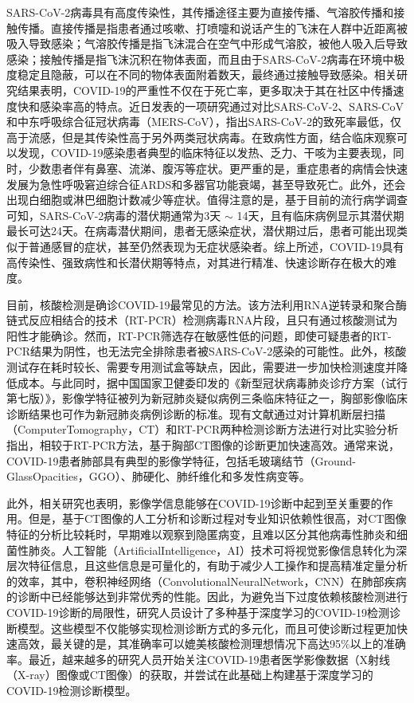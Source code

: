 \documentclass[journal,twoside,web]{ieeecolor}
\begin{document}
SARS-CoV-2病毒具有高度传染性，其传播途径主要为直接传播、气溶胶传播和接触传播。直接传播是指患者通过咳嗽、打喷嚏和说话产生的飞沫在人群中近距离被吸入导致感染；气溶胶传播是指飞沫混合在空气中形成气溶胶，被他人吸入后导致感染；接触传播是指飞沫沉积在物体表面，而且由于SARS-CoV-2病毒在环境中极度稳定且隐蔽，可以在不同的物体表面附着数天，最终通过接触导致感染。相关研究结果表明，COVID-19的严重性不仅在于死亡率，更多取决于其在社区中传播速度快和感染率高的特点。近日发表的一项研究通过对比SARS-CoV-2、SARS-CoV和中东呼吸综合征冠状病毒（MERS-CoV），指出SARS-CoV-2的致死率最低，仅高于流感，但是其传染性高于另外两类冠状病毒。在致病性方面，结合临床观察可以发现，COVID-19感染患者典型的临床特征以发热、乏力、干咳为主要表现，同时，少数患者伴有鼻塞、流涕、腹泻等症状。更严重的是，重症患者的病情会快速发展为急性呼吸窘迫综合征ARDS和多器官功能衰竭，甚至导致死亡。此外，还会出现白细胞或淋巴细胞计数减少等症状。值得注意的是，基于目前的流行病学调查可知，SARS-CoV-2病毒的潜伏期通常为3天 $ \sim $ 14天，且有临床病例显示其潜伏期最长可达24天。在病毒潜伏期间，患者无感染症状，潜伏期过后，患者可能出现类似于普通感冒的症状，甚至仍然表现为无症状感染者。综上所述，COVID-19具有高传染性、强致病性和长潜伏期等特点，对其进行精准、快速诊断存在极大的难度。


目前，核酸检测是确诊COVID-19最常见的方法。该方法利用RNA逆转录和聚合酶链式反应相结合的技术（RT-PCR）检测病毒RNA片段，且只有通过核酸测试为阳性才能确诊。然而，RT-PCR筛选存在敏感性低的问题，即使可疑患者的RT-PCR结果为阴性，也无法完全排除患者被SARS-CoV-2感染的可能性。此外，核酸测试存在耗时较长、需要专用测试盒等缺点，因此，需要进一步加快检测速度并降低成本。与此同时，据中国国家卫健委印发的《新型冠状病毒肺炎诊疗方案（试行第七版）》，影像学特征被列为新冠肺炎疑似病例三条临床特征之一，胸部影像临床诊断结果也可作为新冠肺炎病例诊断的标准。现有文献通过对计算机断层扫描（ComputerTomography，CT）和RT-PCR两种检测诊断方法进行对比实验分析指出，相较于RT-PCR方法，基于胸部CT图像的诊断更加快速高效。通常来说，COVID-19患者肺部具有典型的影像学特征，包括毛玻璃结节（Ground-GlassOpacities，GGO）、肺硬化、肺纤维化和多发性病变等。


此外，相关研究也表明，影像学信息能够在COVID-19诊断中起到至关重要的作用。但是，基于CT图像的人工分析和诊断过程对专业知识依赖性很高，对CT图像特征的分析比较耗时，早期难以观察到隐匿病变，且难以区分其他病毒性肺炎和细菌性肺炎。人工智能（ArtificialIntelligence，AI）技术可将视觉影像信息转化为深层次特征信息，且这些信息是可量化的，有助于减少人工操作和提高精准定量分析的效率，其中，卷积神经网络（ConvolutionalNeuralNetwork，CNN）在肺部疾病的诊断中已经能够达到非常优秀的性能。因此，为避免当下过度依赖核酸检测进行COVID-19诊断的局限性，研究人员设计了多种基于深度学习的COVID-19检测诊断模型。这些模型不仅能够实现检测诊断方式的多元化，而且可使诊断过程更加快速高效，最关键的是，其准确率可以媲美核酸检测理想情况下高达95\%以上的准确率。最近，越来越多的研究人员开始关注COVID-19患者医学影像数据（X射线（X-ray）图像或CT图像）的获取，并尝试在此基础上构建基于深度学习的COVID-19检测诊断模型。
\end{document}
